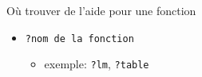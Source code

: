 \documentclass[11pt]{beamer}\usepackage[]{graphicx}\usepackage[]{color}
\newcommand{\code}[1]{\texttt{#1}}
\begin{document}
\begin{frame}{O\`{u} trouver de l'aide pour une fonction}
\begin{itemize}
  \setlength\itemsep{2em}
\item \mbox{\texttt{?nom de la fonction}}
\begin{itemize}
\item exemple: \code{?lm}, \code{?table}
\end{itemize}
\end{itemize}
\end{frame}






\end{document}
